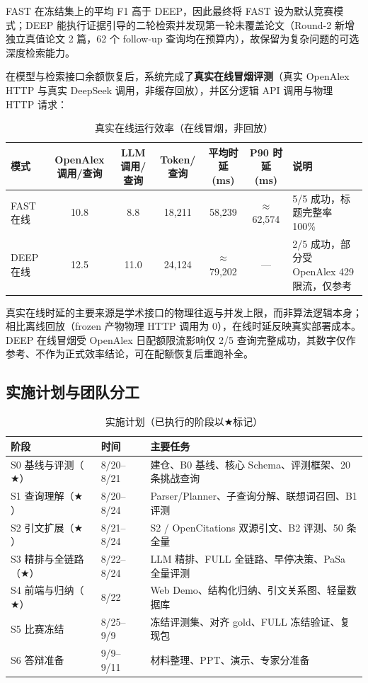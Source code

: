 \documentclass[11pt,a4paper,fontset=macnew]{ctexart}
\begin{document}
FAST 在冻结集上的平均 F1 高于 DEEP，因此最终将 FAST 设为默认竞赛模式；DEEP 能执行证据引导的二轮检索并发现第一轮未覆盖论文（Round-2 新增独立真值论文 2 篇，62 个 follow-up 查询均在预算内），故保留为复杂问题的可选深度检索能力。

在模型与检索接口余额恢复后，系统完成了\textbf{真实在线冒烟评测}（真实 OpenAlex HTTP 与真实 DeepSeek 调用，非缓存回放），并区分逻辑 API 调用与物理 HTTP 请求：

\begin{table}[H]
\centering
\caption{真实在线运行效率（在线冒烟，非回放）}
\label{tab:online}
\small
\begin{tabular}{@{}lcccccl@{}}
\toprule
\textbf{模式} & \textbf{OpenAlex 调用/查询} & \textbf{LLM 调用/查询} & \textbf{Token/查询} & \textbf{平均时延 (ms)} & \textbf{P90 时延 (ms)} & \textbf{说明} \\
\midrule
FAST 在线 & 10.8 & 8.8 & 18,211 & 58,239 & $\approx$62,574 & 5/5 成功，标题完整率 100\% \\
DEEP 在线 & 12.5 & 11.0 & 24,124 & $\approx$79,202 & --- & 2/5 成功，部分受 OpenAlex 429 限流，仅参考 \\
\bottomrule
\end{tabular}
\end{table}

真实在线时延的主要来源是学术接口的物理往返与并发上限，而非算法逻辑本身；相比离线回放（frozen 产物物理 HTTP 调用为 0），在线时延反映真实部署成本。DEEP 在线冒烟受 OpenAlex 日配额限流影响仅 2/5 查询完整成功，其数字仅作参考、不作为正式效率结论，可在配额恢复后重跑补全。

\subsection{实施计划与团队分工}
\label{sec:schedule}

\begin{table}[H]
\centering
\caption{实施计划（已执行的阶段以$\bigstar$标记）}
\label{tab:schedule}
\small
\begin{tabular}{@{}llp{7cm}@{}}
\toprule
\textbf{阶段} & \textbf{时间} & \textbf{主要任务} \\
\midrule
S0 基线与评测（$\bigstar$） & 8/20--8/21 & 建仓、B0 基线、核心 Schema、评测框架、20 条挑战查询 \\
S1 查询理解（$\bigstar$） & 8/20--8/24 & Parser/Planner、子查询分解、联想词召回、B1 评测 \\
S2 引文扩展（$\bigstar$） & 8/21--8/24 & S2 / OpenCitations 双源引文、B2 评测、50 条全量 \\
S3 精排与全链路（$\bigstar$） & 8/22--8/24 & LLM 精排、FULL 全链路、早停决策、PaSa 全量评测 \\
S4 前端与归纳（$\bigstar$） & 8/22 & Web Demo、结构化归纳、引文关系图、轻量数据库 \\
S5 比赛冻结 & 8/25--9/9 & 冻结评测集、对齐 gold、FULL 冻结验证、复现包 \\
S6 答辩准备 & 9/9--9/11 & 材料整理、PPT、演示、专家分准备 \\
\bottomrule
\end{tabular}
\end{table}
\end{document}

